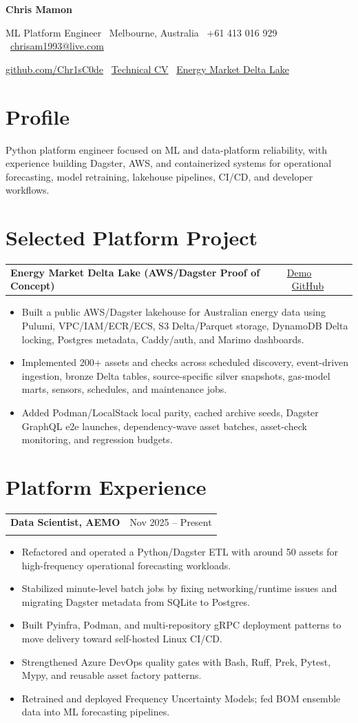 \documentclass[10pt,a4paper]{article}
\makeatletter
\newcommand{\resumeheader}[4]{
  {\LARGE\textbf{\textcolor{textdark}{#1}}}\par
  \textcolor{mutedtext}{#2 \textbar\ #3 \textbar\ \href{mailto:#4}{#4}}\par
  \textcolor{mutedtext}{\href{https://github.com/Chr1sC0de/}{github.com/Chr1sC0de}
  \textbar\
  \href{https://chr1sc0de.github.io/Resume/}{Technical CV}
  \textbar\
  \href{https://github.com/Chr1sC0de/energy-market-delta-lake}{Energy Market Delta Lake}}\par
}
\newcommand{\resumesection}[1]{\section*{#1}}
\newenvironment{resumejob}[3]{
  \par\addvspace{0.28em}
  \noindent\begin{tabularx}{\textwidth}{@{}>{\raggedright\arraybackslash}X>{\raggedleft\arraybackslash}p{0.28\textwidth}@{}}
    \textbf{\textcolor{textdark}{#1}} & \textcolor{mutedtext}{#2} \\
    \multicolumn{2}{@{}l@{}}{\textit{\textcolor{mutedtext}{#3}}}
  \end{tabularx}
  \vspace{-0.62em}
}{
  \par\addvspace{0.06em}
}
\newcommand{\resumeproject}[2]{
  \par\addvspace{0.12em}
  \noindent\begin{tabularx}{\textwidth}{@{}>{\raggedright\arraybackslash}X>{\raggedleft\arraybackslash}p{0.34\textwidth}@{}}
    \textbf{\textcolor{textdark}{#1}} & #2
  \end{tabularx}
  \vspace{-0.62em}
}
\makeatother
\begin{document}
\fontsize{9.25}{10.15}\selectfont

\resumeheader{Chris Mamon}{ML Platform Engineer \textbar\ Melbourne, Australia}{+61 413 016 929}{chrisam1993@live.com}

\resumesection{Profile}
Python platform engineer focused on ML and data-platform reliability, with experience building Dagster, AWS, and containerized systems for operational forecasting, model retraining, lakehouse pipelines, CI/CD, and developer workflows.

\resumesection{Selected Platform Project}
\resumeproject{Energy Market Delta Lake (AWS/Dagster Proof of Concept)}{\href{https://ausenergymarketdata.com/dagster-webserver/guest}{Demo} \textbar\ \href{https://github.com/Chr1sC0de/energy-market-delta-lake}{GitHub}}
\begin{itemize}
  \item Built a public AWS/Dagster lakehouse for Australian energy data using Pulumi, VPC/IAM/ECR/ECS, S3 Delta/Parquet storage, DynamoDB Delta locking, Postgres metadata, Caddy/auth, and Marimo dashboards.
  \item Implemented 200+ assets and checks across scheduled discovery, event-driven ingestion, bronze Delta tables, source-specific silver snapshots, gas-model marts, sensors, schedules, and maintenance jobs.
  \item Added Podman/LocalStack local parity, cached archive seeds, Dagster GraphQL e2e launches, dependency-wave asset batches, asset-check monitoring, and regression budgets.
\end{itemize}

\resumesection{Platform Experience}
\begin{resumejob}{Data Scientist, AEMO}{Nov 2025 -- Present}{NEM Operational Forecasting}
\begin{itemize}
  \item Refactored and operated a Python/Dagster ETL with around 50 assets for high-frequency operational forecasting workloads.
  \item Stabilized minute-level batch jobs by fixing networking/runtime issues and migrating Dagster metadata from SQLite to Postgres.
  \item Built Pyinfra, Podman, and multi-repository gRPC deployment patterns to move delivery toward self-hosted Linux CI/CD.
  \item Strengthened Azure DevOps quality gates with Bash, Ruff, Prek, Pytest, Mypy, and reusable asset factory patterns.
  \item Retrained and deployed Frequency Uncertainty Models; fed BOM ensemble data into ML forecasting pipelines.
\end{itemize}
\end{resumejob}
\end{document}

